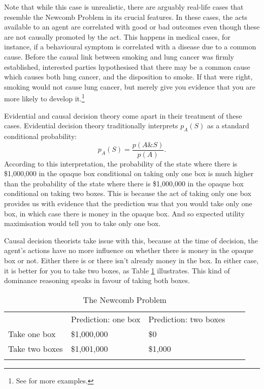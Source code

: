 Note that while this case is unrealistic, there are arguably real-life cases that resemble the Newcomb Problem in its crucial features. In these cases, the acts available to an agent are correlated with good or bad outcomes even though these are not causally promoted by the act. This happens in medical cases, for instance, if a behavioural symptom is correlated with a disease due to a common cause. Before the causal link between smoking and lung cancer was firmly established, interested parties hypothesised that there may be a common cause which causes both lung cancer, and the disposition to smoke. If that were right, smoking would not cause lung cancer, but merely give you evidence that you are more likely to develop it.\footnote{See \citet{Price1991} for more examples.}

Evidential and causal decision theory come apart in their treatment of these cases. Evidential decision theory traditionally interprets $p_{A} (S)$ as a standard conditional probability:
$$p_{A} (S) = \frac{p(A\&S)}{p(A)}.$$
According to this interpretation, the probability of the state where there is \$1,000,000 in the opaque box conditional on taking only one box is much higher than the probability of the state where there is \$1,000,000 in the opaque box conditional on taking two boxes. This is because the act of taking only one box provides us with evidence that the prediction was that you would take only one box, in which case there is money in the opaque box. And so expected utility maximisation would tell you to take only one box.

Causal decision theorists take issue with this, because at the time of decision, the agent's actions have no more influence on whether there is money in the opaque box or not. Either there is or there isn't already money in the box. In either case, it is better for you to take two boxes, as Table \ref{t4} illustrates. This kind of dominance reasoning speaks in favour of taking both boxes.

\begin{table}
\centering
\label{my-label}
\begin{tabular}{lllll}
\cline{2-3}
\multicolumn{1}{l|}{}                & \multicolumn{1}{l|}{Prediction: one box} & \multicolumn{1}{l|}{Prediction: two boxes} &  &  \\ \cline{1-3}
\multicolumn{1}{|l|}{Take one box}   & \multicolumn{1}{l|}{\$1,000,000}         & \multicolumn{1}{l|}{\$0}                   &  &  \\ \cline{1-3}
\multicolumn{1}{|l|}{Take two boxes} & \multicolumn{1}{l|}{\$1,001,000}         & \multicolumn{1}{l|}{\$1,000}               &  &  \\ \cline{1-3}
                                     &                                          &                                            &  &
\end{tabular}
\caption{The Newcomb Problem}
\label{t4}
\end{table}

